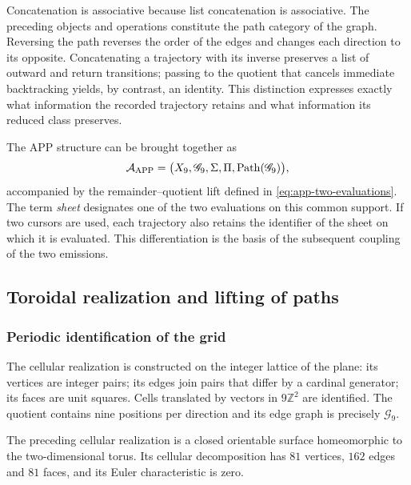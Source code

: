 Concatenation is associative because list concatenation is associative. The preceding objects and operations constitute the path category of the graph. Reversing the path reverses the order of the edges and changes each direction to its opposite. Concatenating a trajectory with its inverse preserves a list of outward and return transitions; passing to the quotient that cancels immediate backtracking yields, by contrast, an identity. This distinction expresses exactly what information the recorded trajectory retains and what information its reduced class preserves.

The APP structure can be brought together as
\[
 \mathcal A_{\rm APP}=
 \bigl(X_9,\mathscr G_9,\Sigma,\Pi,
             \operatorname{Path}(\mathscr G_9)\bigr),
\]
accompanied by the remainder--quotient lift defined in \eqref{eq:app-two-evaluations}. The term \emph{sheet} designates one of the two evaluations on this common support. If two cursors are used, each trajectory also retains the identifier of the sheet on which it is evaluated. This differentiation is the basis of the subsequent coupling of the two emissions.

\subsection{Toroidal realization and lifting of paths}
\label{geo:toro}

\subsubsection{Periodic identification of the grid}

The cellular realization is constructed on the integer lattice of the plane: its vertices are integer pairs; its edges join pairs that differ by a cardinal generator; its faces are unit squares. Cells translated by vectors in $9\mathbb Z^2$ are identified. The quotient contains nine positions per direction and its edge graph is precisely $\mathscr G_9$.

\begin{proposicion}
\label{geo:prop-toro}
The preceding cellular realization is a closed orientable surface homeomorphic to the two-dimensional torus. Its cellular decomposition has $81$ vertices, $162$ edges and $81$ faces, and its Euler characteristic is zero.
\end{proposicion}

